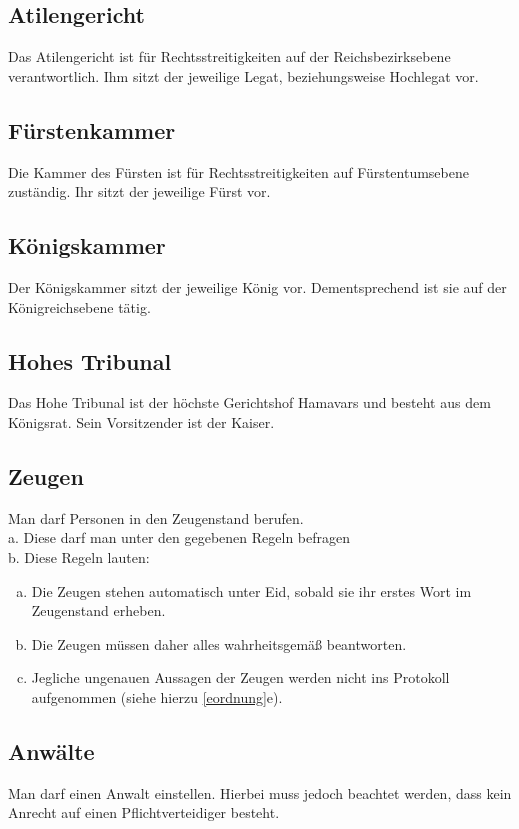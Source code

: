 \documentclass{article}
\begin{document}
\subsection{Atilengericht}
Das Atilengericht ist für Rechtsstreitigkeiten auf der Reichsbezirksebene verantwortlich. Ihm sitzt der jeweilige Legat, beziehungsweise Hochlegat vor.

\subsection{Fürstenkammer}
Die Kammer des Fürsten ist für Rechtsstreitigkeiten auf Fürstentumsebene zuständig. Ihr sitzt der jeweilige Fürst vor.

\subsection{Königskammer}
Der Königskammer sitzt der jeweilige König vor. Dementsprechend ist sie auf der Königreichsebene tätig.

\subsection{Hohes Tribunal}
Das Hohe Tribunal ist der höchste Gerichtshof Hamavars und besteht aus dem Königsrat. Sein Vorsitzender ist der Kaiser.

\subsection{Zeugen}\label{zeugen}
Man darf Personen in den Zeugenstand berufen.\\
a. Diese darf man unter den gegebenen Regeln befragen  \\
b. Diese Regeln lauten:  \\
\begin{enumerate}[a)]
	\item Die Zeugen stehen automatisch unter Eid, sobald sie ihr erstes Wort im Zeugenstand erheben.
	\item Die Zeugen müssen daher alles wahrheitsgemäß beantworten.
	\item Jegliche ungenauen Aussagen der Zeugen werden nicht ins Protokoll aufgenommen (siehe hierzu \ref{eordnung}e).
\end{enumerate}

\subsection{Anwälte}
Man darf einen Anwalt einstellen. Hierbei muss jedoch beachtet werden, dass kein Anrecht auf einen Pflichtverteidiger besteht.
\end{document}

